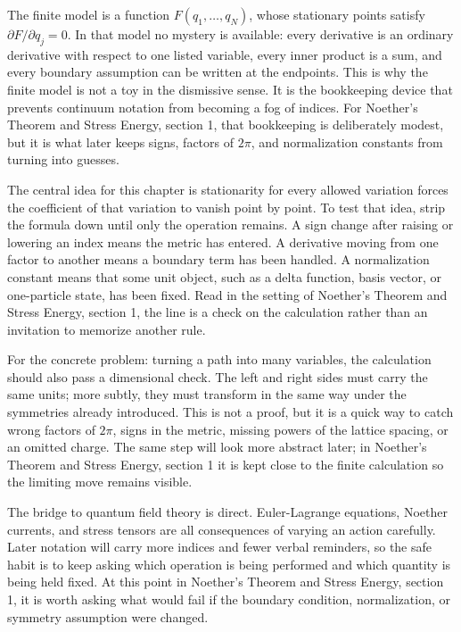The finite model is a function \(F(q_1,\ldots,q_N)\), whose stationary points satisfy \( \partial F/\partial q_j=0 \).  In that model no mystery is available: every derivative is an ordinary derivative with respect to one listed variable, every inner product is a sum, and every boundary assumption can be written at the endpoints.  This is why the finite model is not a toy in the dismissive sense.  It is the bookkeeping device that prevents continuum notation from becoming a fog of indices.  For Noether's Theorem and Stress Energy, section 1, that bookkeeping is deliberately modest, but it is what later keeps signs, factors of \(2\pi\), and normalization constants from turning into guesses.

The central idea for this chapter is stationarity for every allowed variation forces the coefficient of that variation to vanish point by point.  To test that idea, strip the formula down until only the operation remains.  A sign change after raising or lowering an index means the metric has entered.  A derivative moving from one factor to another means a boundary term has been handled.  A normalization constant means that some unit object, such as a delta function, basis vector, or one-particle state, has been fixed.  Read in the setting of Noether's Theorem and Stress Energy, section 1, the line is a check on the calculation rather than an invitation to memorize another rule.

For the concrete problem: turning a path into many variables, the calculation should also pass a dimensional check.  The left and right sides must carry the same units; more subtly, they must transform in the same way under the symmetries already introduced.  This is not a proof, but it is a quick way to catch wrong factors of \(2\pi\), signs in the metric, missing powers of the lattice spacing, or an omitted charge.  The same step will look more abstract later; in Noether's Theorem and Stress Energy, section 1 it is kept close to the finite calculation so the limiting move remains visible.

The bridge to quantum field theory is direct.  Euler-Lagrange equations, Noether currents, and stress tensors are all consequences of varying an action carefully.  Later notation will carry more indices and fewer verbal reminders, so the safe habit is to keep asking which operation is being performed and which quantity is being held fixed.  At this point in Noether's Theorem and Stress Energy, section 1, it is worth asking what would fail if the boundary condition, normalization, or symmetry assumption were changed.

